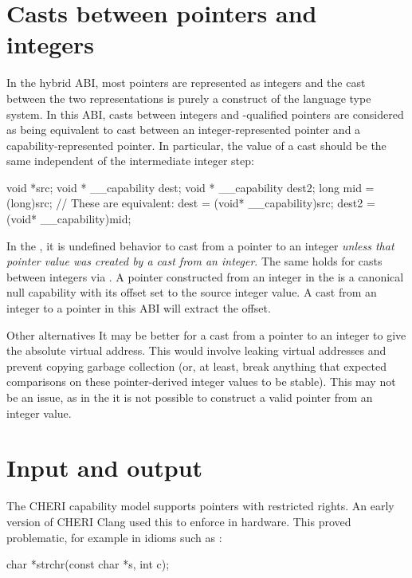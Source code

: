 \section{Casts between pointers and integers}

In the hybrid ABI, most pointers are represented as integers and the cast between the two representations is purely a construct of the language type system.
In this ABI, casts between integers and -qualified pointers are considered as being equivalent to cast between an integer-represented pointer and a capability-represented pointer.
In particular, the value of a cast should be the same independent of the intermediate integer step:
\begin{csnippet}
	void *src;
	void * __capability dest;
	void * __capability dest2;
	long mid = (long)src;
	// These are equivalent:
	dest = (void* __capability)src;
	dest2 = (void* __capability)mid;
\end{csnippet}

In the \sandboxABI, it is undefined behavior to cast from a pointer to an integer \textit{unless that pointer value was created by a cast from an integer}.
The same holds for casts between integers via .
A pointer constructed from an integer in the \sandboxABI{} is a canonical null capability with its offset set to the source integer value.
A cast from an integer to a pointer in this ABI will extract the offset.

\begin{notebox}{Other alternatives}
	It may be better for a cast from a pointer to an integer to give the absolute virtual address.
	This would involve leaking virtual addresses and prevent copying garbage collection (or, at least, break anything that expected comparisons on these pointer-derived integer values to be stable).
	This may not be an issue, as in the \sandboxABI{} it is not possible to construct a valid pointer from an integer value.
\end{notebox}

\section{Input and output}

The CHERI capability model supports pointers with restricted rights.
An early version of CHERI Clang used this to enforce  in hardware.
This proved problematic, for example in idioms such as :

\begin{csnippet}
char *strchr(const char *s, int c);
\end{csnippet}

